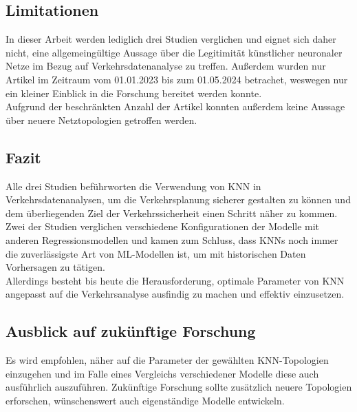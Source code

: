 \documentclass{scrartcl}
\begin{document}
\subsection{Limitationen}

In dieser Arbeit werden lediglich drei Studien verglichen und eignet sich daher
nicht, eine allgemeingültige Aussage über die Legitimität künstlicher neuronaler
Netze im Bezug auf Verkehrsdatenanalyse zu treffen. Außerdem wurden nur
Artikel im Zeitraum vom 01.01.2023 bis zum 01.05.2024 betrachet, weswegen nur ein 
kleiner Einblick in die Forschung bereitet werden konnte.
\medskip \\
Aufgrund der beschränkten Anzahl der Artikel konnten außerdem keine Aussage
über neuere Netztopologien getroffen werden.

\subsection{Fazit}

Alle drei Studien beführworten die Verwendung von KNN in
Verkehrsdatenanalysen, um die Verkehrsplanung sicherer gestalten zu können
und dem überliegenden Ziel der Verkehrssicherheit einen Schritt näher zu kommen.
Zwei der Studien verglichen verschiedene Konfigurationen der Modelle mit anderen
Regressionsmodellen und kamen zum Schluss, dass KNNs noch immer die zuverlässigste
Art von ML-Modellen ist, um mit historischen Daten Vorhersagen zu tätigen.
\medskip \\
Allerdings besteht bis heute die Herausforderung, optimale Parameter von
KNN angepasst auf die Verkehrsanalyse ausfindig zu machen und effektiv einzusetzen.

\subsection{Ausblick auf zukünftige Forschung}

Es wird empfohlen, näher auf die Parameter der gewählten KNN-Topologien
einzugehen und im Falle eines Vergleichs verschiedener Modelle diese auch
ausführlich auszuführen. Zukünftige Forschung sollte zusätzlich neuere
Topologien erforschen, wünschenswert auch eigenständige Modelle entwickeln.

\printbibliography
\listoffigures
\listoftables
\end{document}

